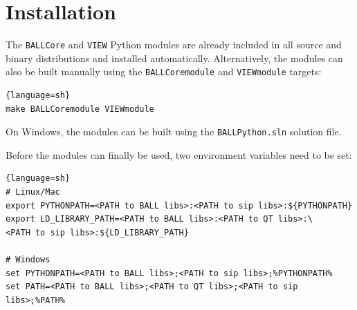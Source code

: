\section{Installation}

The \texttt{BALLCore} and \texttt{VIEW} Python modules are already included
in all source and  binary distributions and installed automatically.
Alternatively, the modules can also be built manually using the
\texttt{BALLCoremodule} and \texttt{VIEWmodule} targets:
\begin{lstlisting}{language=sh}
make BALLCoremodule VIEWmodule
\end{lstlisting}
On Windows, the modules can be built using the \texttt{BALLPython.sln}
solution file.

Before the modules can finally be used, two environment variables need to be set:
\begin{lstlisting}{language=sh}
# Linux/Mac
export PYTHONPATH=<PATH to BALL libs>:<PATH to sip libs>:${PYTHONPATH}
export LD_LIBRARY_PATH=<PATH to BALL libs>:<PATH to QT libs>:\
<PATH to sip libs>:${LD_LIBRARY_PATH}

# Windows
set PYTHONPATH=<PATH to BALL libs>;<PATH to sip libs>;%PYTHONPATH%
set PATH=<PATH to BALL libs>;<PATH to QT libs>;<PATH to sip libs>;%PATH%
\end{lstlisting}

